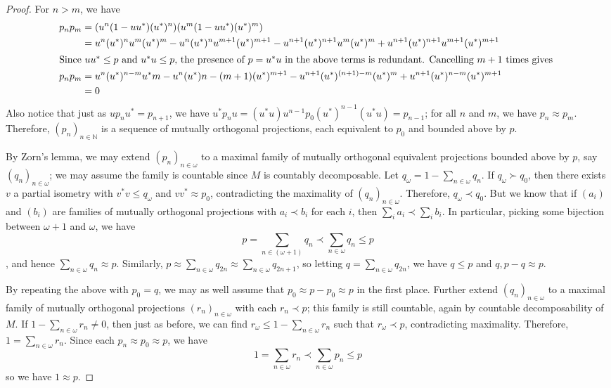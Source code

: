 \documentclass[a4paper,10pt]{report}
\newcommand{\N}{\mathbb{N}}
\begin{document}
\begin{enumerate}
\begin{proof}
		For $n>m$, we have 
		\begin{align*}
			p_np_m &= (u^n(1-uu^*)(u^*)^n)(u^m(1-uu^*)(u^*)^m)\\
			&= u^n(u^*)^nu^m(u^*)^m-u^n(u^*)^nu^{m+1}(u^*)^{m+1}-u^{n+1}(u^*)^{n+1}u^m(u^*)^m+u^{n+1}(u^*)^{n+1}u^{m+1}(u^*)^{m+1}\\
			\intertext{Since $uu^*\le p$ and $u^*u\le p$, the presence of $p=u^*u$ in the above terms is redundant. Cancelling $m+1$ times gives }
			p_np_m &= u^n(u^*)^{n-m}u^*m-u^n(u^*){n-(m+1)}(u^*)^{m+1}-u^{n+1}(u^*)^{(n+1)-m}(u^*)^m+u^{n+1}(u^*)^{n-m}(u^*)^{m+1}\\
			&= 0
		\end{align*}
		Also notice that just as $up_nu^*=p_{n+1}$, we have $u^*p_nu=(u^*u)u^{n-1}p_0(u^*)^{n-1}(u^*u)=p_{n-1}$; for all $n$ and $m$, we have $p_n\approx p_m$. Therefore, $(p_n)_{n\in\N}$ is a sequence of mutually orthogonal projections, each equivalent to $p_0$ and bounded above by $p$. 

		By Zorn's lemma, we may extend $(p_n)_{n\in\omega}$ to a maximal family of mutually orthogonal equivalent projections bounded above by $p$, say $(q_n)_{n\in\omega}$; we may assume the family is countable since $M$ is countably decomposable. Let $q_\omega=1-\sum_{n\in\omega}q_n$. If $q_\omega\succ q_0$, then there exists $v$ a partial isometry with $v^*v\le q_\omega$ and $vv^*\approx p_0$, contradicting the maximality of $(q_n)_{n\in\omega}$. Therefore, $q_\omega\prec q_0$. But we know that if $(a_i)$ and $(b_i)$ are families of mutually orthogonal projections with $a_i\prec b_i$ for each $i$, then $\sum_ia_i\prec\sum_ib_i$. %
		In particular, picking some bijection between $\omega+1$ and $\omega$, we have 
		\[p=\sum_{n\in(\omega+1)}q_n\prec\sum_{n\in\omega}q_n\le p\], and hence $\sum_{n\in\omega}q_n\approx p$. Similarly, $p\approx\sum_{n\in\omega}q_{2n}\approx\sum_{n\in\omega}q_{2n+1}$, so letting $q=\sum_{n\in\omega}q_{2n}$, we have $q\le p$ and $q,p-q\approx p$. 

		By repeating the above with $p_0=q$, we may as well assume that $p_0\approx p-p_0\approx p$ in the first place. Further extend $(q_n)_{n\in\omega}$ to a maximal family of mutually orthogonal projections $(r_n)_{n\in\omega}$ with each $r_n\prec p$; this family is still countable, again by countable decomposability of $M$. If $1-\sum_{n\in\omega}r_n\neq 0$, then just as before, we can find $r_\omega\le 1-\sum_{n\in\omega}r_n$ such that $r_\omega\prec p$, contradicting maximality. Therefore, $1=\sum_{n\in\omega}r_n$. Since each $p_n\approx p_0\approx p$, we have 
		\[1=\sum_{n\in\omega}r_n\prec\sum_{n\in\omega}p_n\le p\]
	 so we have $1\approx p$. 


\end{proof}
\end{enumerate}
\end{document}
